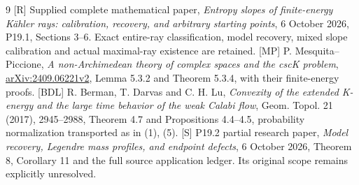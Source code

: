 \documentclass[11pt]{article}
\begin{document}
\begin{thebibliography}{9}
[R] Supplied complete mathematical paper,
\emph{Entropy slopes of finite-energy K\"ahler rays: calibration,
recovery, and arbitrary starting points}, 6 October 2026,
P19.1, Sections 3--6. Exact entire-ray classification, model recovery,
mixed slope calibration and actual maximal-ray existence are retained.
[MP] P. Mesquita--Piccione,
\emph{A non-Archimedean theory of complex spaces and the cscK problem},
\href{https://arxiv.org/pdf/2409.06221v2}{arXiv:2409.06221v2},
Lemma 5.3.2 and Theorem 5.3.4, with their finite-energy proofs.
[BDL] R. Berman, T. Darvas and C. H. Lu,
\emph{Convexity of the extended K-energy and the large time behavior
of the weak Calabi flow}, Geom. Topol. 21 (2017), 2945--2988,
Theorem 4.7 and Propositions 4.4--4.5, probability normalization
transported as in (1), (5).
[S] P19.2 partial research paper,
\emph{Model recovery, Legendre mass profiles, and endpoint defects},
6 October 2026, Theorem 8, Corollary 11 and the full source application
ledger. Its original scope remains explicitly unresolved.
\end{thebibliography}
\end{document}
